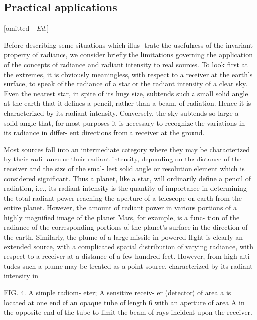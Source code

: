 \begin{refsection}
\section{Practical applications}
[omitted---\textit{Ed.}]

\ifomit
Before describing some situations which illus-
trate the usefulness of the invariant property of
radiance, we consider briefly the limitations
governing the application of the concepts of
radiance and radiant intensity to real sources.
To look first at the extremes, it is obviously
meaningless, with respect to a receiver at the
earth’s surface, to speak of the radiance of a star
or the radiant intensity of a clear sky. Even the
nearest star, in spite of its huge size, subtends
such a small solid angle at the earth that it
defines a pencil, rather than a beam, of radiation.
Hence it is characterized by its radiant intensity.
Conversely, the sky subtends so large a solid
angle that, for most purposes it is necessary to
recognize the variations in its radiance in differ-
ent directions from a receiver at the ground.

Most sources fall into an intermediate category
where they may be characterized by their radi-
ance or their radiant intensity, depending on the
distance of the receiver and the size of the smal-
lest solid angle or resolution element which is
considered significant. Thus a planet, like a star,
will ordinarily define a pencil of radiation, i.e.,
its radiant intensity is the quantity of importance
in determining the total radiant power reaching
the aperture of a telescope on earth from the
entire planet. However, the amount of radiant
power in various portions of a highly magnified
image of the planet Mars, for example, is a func-
tion of the radiance of the corresponding portions
of the planet's surface in the direction of the
earth. Similarly, the plume of a large missile in
powered flight is clearly an extended source, with
a complicated spatial distribution of varying
radiance, with respect to a receiver at a distance
of a few hundred feet. However, from high alti-
tudes such a plume may be treated as a point
source, characterized by its radiant intensity in

FIG. 4. A simple radiom-
eter; A sensitive receiv-
er (detector) of area a
is located at one end of
an opaque tube of length
6 with an aperture of area
A in the opposite end of
the tube to limit the beam
of rays incident upon the
receiver.



\end{refsection}
